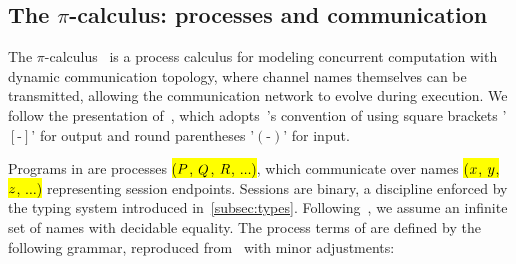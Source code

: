 \subsection{The \texorpdfstring{$\pi$}{pi}-calculus: processes and communication}\label{subsec:processes}
The $\pi$-calculus~\citep{MPW92} is a process calculus for modeling concurrent computation with dynamic communication topology, where channel names themselves can be transmitted, allowing the communication network to evolve during execution. We follow the presentation of~\citet{abs-2106-11818}, which adopts~\citeauthor{W14}'s convention of using square brackets '$[\text{-}]$' for output and round parentheses '$(\text{-})$' for input.

Programs in \pill{} are processes \hl{($P$, $Q$, $R$, $\dots$)}, which communicate over names \hl{($x$, $y$, $z$, $\dots$)} representing session endpoints. Sessions are binary, a discipline enforced by the typing system introduced in~\cref{subsec:types}. Following~\citet{abs-2106-11818}, we assume an infinite set of names with decidable equality. The process terms of \pill{} are defined by the following grammar, reproduced from~\citet{abs-2106-11818} with minor adjustments:

